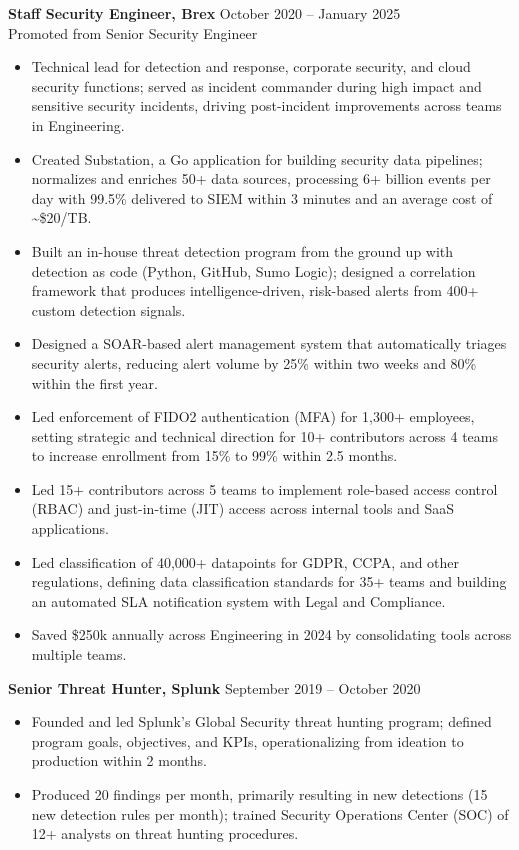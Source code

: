 \documentclass[10pt,letterpaper]{article}
\begin{document}
\textbf{Staff Security Engineer, Brex} \hfill October 2020 -- January 2025\\
Promoted from Senior Security Engineer
\begin{itemize}
  \item Technical lead for detection and response, corporate security, and cloud security functions; served as incident commander during high impact and sensitive security incidents, driving post-incident improvements across teams in Engineering.
  \item Created Substation, a Go application for building security data pipelines; normalizes and enriches 50+ data sources, processing 6+ billion events per day with 99.5\% delivered to SIEM within 3 minutes and an average cost of \textasciitilde\$20/TB.
  \item Built an in-house threat detection program from the ground up with detection as code (Python, GitHub, Sumo Logic); designed a correlation framework that produces intelligence-driven, risk-based alerts from 400+ custom detection signals.
  \item Designed a SOAR-based alert management system that automatically triages security alerts, reducing alert volume by 25\% within two weeks and 80\% within the first year.
  \item Led enforcement of FIDO2 authentication (MFA) for 1,300+ employees, setting strategic and technical direction for 10+ contributors across 4 teams to increase enrollment from 15\% to 99\% within 2.5 months.
  \item Led 15+ contributors across 5 teams to implement role-based access control (RBAC) and just-in-time (JIT) access across internal tools and SaaS applications.
  \item Led classification of 40,000+ datapoints for GDPR, CCPA, and other regulations, defining data classification standards for 35+ teams and building an automated SLA notification system with Legal and Compliance.
  \item Saved \$250k annually across Engineering in 2024 by consolidating tools across multiple teams.
\end{itemize}

\textbf{Senior Threat Hunter, Splunk} \hfill September 2019 -- October 2020
\begin{itemize}
  \item Founded and led Splunk's Global Security threat hunting program; defined program goals, objectives, and KPIs, operationalizing from ideation to production within 2 months.
  \item Produced 20 findings per month, primarily resulting in new detections (15 new detection rules per month); trained Security Operations Center (SOC) of 12+ analysts on threat hunting procedures.
\end{itemize}
\end{document}
